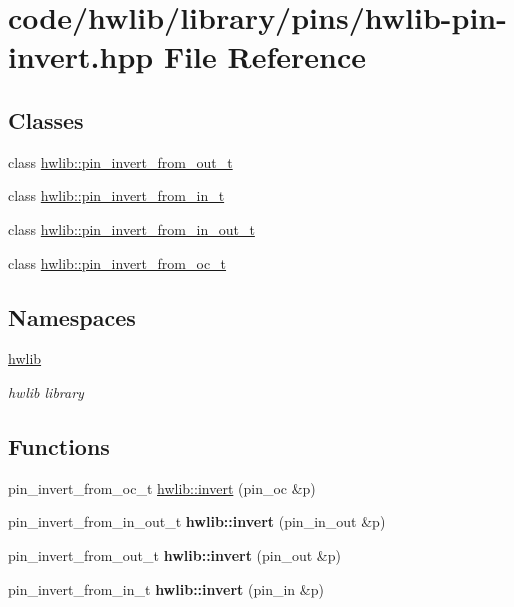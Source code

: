 \hypertarget{hwlib-pin-invert_8hpp}{}\section{code/hwlib/library/pins/hwlib-\/pin-\/invert.hpp File Reference}
\label{hwlib-pin-invert_8hpp}
\subsection*{Classes}
\begin{DoxyCompactItemize}
\item 
class \hyperlink{classhwlib_1_1pin__invert__from__out__t}{hwlib\+::pin\+\_\+invert\+\_\+from\+\_\+out\+\_\+t}
\item 
class \hyperlink{classhwlib_1_1pin__invert__from__in__t}{hwlib\+::pin\+\_\+invert\+\_\+from\+\_\+in\+\_\+t}
\item 
class \hyperlink{classhwlib_1_1pin__invert__from__in__out__t}{hwlib\+::pin\+\_\+invert\+\_\+from\+\_\+in\+\_\+out\+\_\+t}
\item 
class \hyperlink{classhwlib_1_1pin__invert__from__oc__t}{hwlib\+::pin\+\_\+invert\+\_\+from\+\_\+oc\+\_\+t}
\end{DoxyCompactItemize}
\subsection*{Namespaces}
\begin{DoxyCompactItemize}
\item 
 \hyperlink{namespacehwlib}{hwlib}
\begin{DoxyCompactList}\small\item\em hwlib library \end{DoxyCompactList}\end{DoxyCompactItemize}
\subsection*{Functions}
\textbf{ }\par
\begin{DoxyCompactItemize}
\item 
pin\+\_\+invert\+\_\+from\+\_\+oc\+\_\+t \hyperlink{namespacehwlib_ae3ff35b5dc535898b776d2a42131d0b6}{hwlib\+::invert} (pin\+\_\+oc \&p)
\item 
\mbox{\label{namespacehwlib_ae79f2da201916e348dd0c0cf0f0352b0}} 
pin\+\_\+invert\+\_\+from\+\_\+in\+\_\+out\+\_\+t {\bfseries hwlib\+::invert} (pin\+\_\+in\+\_\+out \&p)
\item 
\mbox{\label{namespacehwlib_a32ec55b7226ba38b21bed9c556fc0d76}} 
pin\+\_\+invert\+\_\+from\+\_\+out\+\_\+t {\bfseries hwlib\+::invert} (pin\+\_\+out \&p)
\item 
\mbox{\label{namespacehwlib_a9f5abdc6d92b958543fe69414f2cb00e}} 
pin\+\_\+invert\+\_\+from\+\_\+in\+\_\+t {\bfseries hwlib\+::invert} (pin\+\_\+in \&p)
\end{DoxyCompactItemize}

